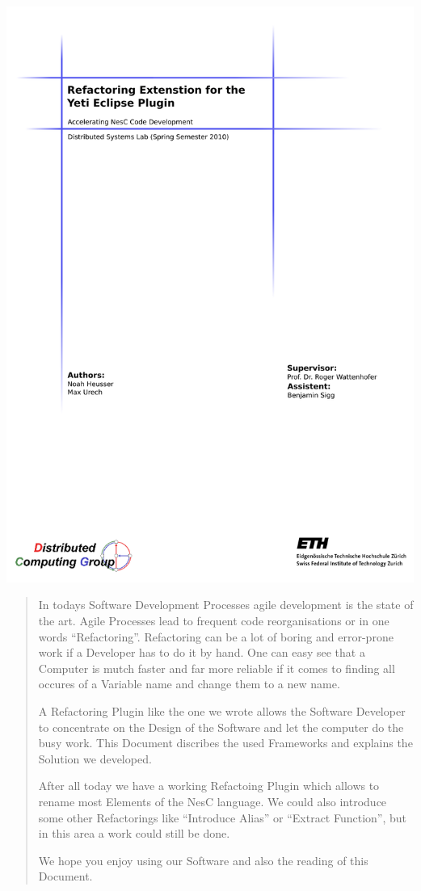 \documentclass[a4paper,10pt]{report}
\begin{document}
\begin{titlepage}
\begin{center}
\includegraphics[width=.95\textwidth]{titelblatt.png}
\end{center}
\end{titlepage}


\begin{abstract}
In todays Software Development Processes agile development is the state of the art. Agile Processes lead to frequent code reorganisations or in one words ``Refactoring''.
Refactoring can be a lot of boring and error-prone work if a Developer has to do it by hand. One can easy see that a Computer is mutch faster and far more reliable if
it comes to finding all occures of a Variable name and change them to a new name.

A Refactoring Plugin like the one we wrote allows the Software Developer to concentrate on the Design of the Software and let the computer do the busy work. This Document
discribes the used Frameworks and explains the Solution we developed.

After all today we have a working Refactoing Plugin which allows to rename most Elements of the NesC language. We could also introduce some other Refactorings like 
``Introduce Alias'' or ``Extract Function'', but in this area a work could still be done.

We hope you enjoy using our Software and also the reading of this Document. 
\end{abstract}
\end{document}
